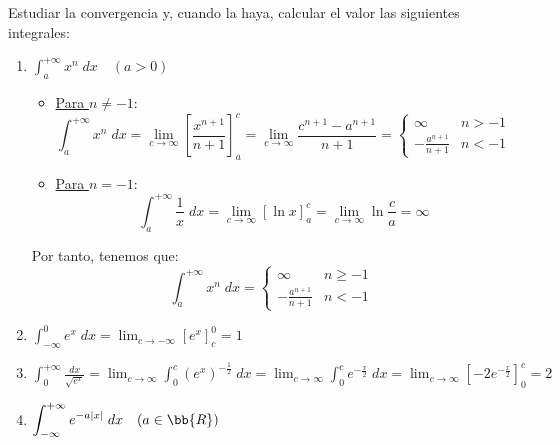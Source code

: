 \begin{ejercicio} Estudiar la convergencia y, cuando la haya, calcular el valor las siguientes integrales:
\begin{enumerate}
    \item $\displaystyle \int_a^{+\infty} x^n\;dx \quad (a>0)$
    \begin{itemize}
        \item \underline{Para $n\neq -1$}:
        \begin{equation*}
            \int_a^{+\infty} x^n\;dx = \lim_{c\to \infty}\left[\frac{x^{n+1}}{n+1}\right]_a^c = \lim_{c\to \infty} \frac{c^{n+1}-a^{n+1}}{n+1} = \left\{\begin{array}{cc}
                \infty & n>-1 \\
                -\frac{a^{n+1}}{n+1} & n<-1
            \end{array}\right.
        \end{equation*}

        \item \underline{Para $n= -1$}:
        \begin{equation*}
            \int_a^{+\infty} \frac{1}{x}\;dx = \lim_{c\to \infty}\left[\ln x\right]_a^c = \lim_{c\to \infty} \ln \frac{c}{a} = \infty
        \end{equation*}
    \end{itemize}
    

    Por tanto, tenemos que:
    \begin{equation*}
        \int_a^{+\infty} x^n\;dx = \left\{\begin{array}{cc}
            \infty & n\geq -1 \\
            \displaystyle -\frac{a^{n+1}}{n+1} & n<-1
        \end{array}\right.
    \end{equation*}
    
    \item $\displaystyle \int_{-\infty}^{0} e^x\;dx  = \lim_{c\to -\infty}\left[e^x\right]_c^0 = 1$
    
    \item $\displaystyle \int_0^{+\infty} \frac{dx}{\sqrt{e^x}} = \lim_{c\to \infty} \int_0^c (e^x)^{-\frac{1}{2}}\;dx
        = \lim_{c\to \infty} \int_0^c e^{-\frac{x}{2}}\;dx
        = \lim_{c\to \infty} \left[-2e^{-\frac{x}{2}}\right]_0^c = 2$
    
    
    \item $\displaystyle \int_{-\infty}^{+\infty} e^{-a|x|}\;dx \quad (a\in \bb{R})$
    

\end{enumerate}
\end{ejercicio}
